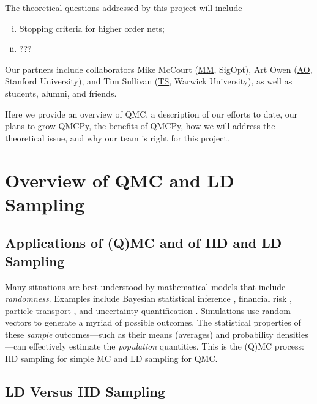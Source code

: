 \documentclass[11pt]{NSFamsart}
\newcommand{\AO}{\hyperlink{AOlink}{AO}\xspace}
\newcommand{\MM}{\hyperlink{MMlink}{MM}\xspace}
\newcommand{\TS}{\hyperlink{TSlink}{TS}\xspace}
\begin{document}
The theoretical questions addressed by this project will include
\begin{enumerate}[i.]
\item Stopping criteria for higher order nets;
\item ???
\end{enumerate}

Our partners include  collaborators \hypertarget{MMlink}{Mike McCourt} (\MM, SigOpt), \hypertarget{AOlink}{Art Owen} (\AO, Stanford University), and \hypertarget{TSlink}{Tim Sullivan} (\TS, Warwick University), as well as students, alumni, and friends.

Here we provide an overview of QMC, a description of our efforts to date, our plans to grow QMCPy, the benefits of QMCPy, how we will address the theoretical issue, and why our team is right for this project.

\section{Overview of QMC and LD Sampling}

\subsection{Applications of (Q)MC and of IID and LD Sampling}
Many situations are best understood by mathematical models that include \emph{randomness}.  Examples include Bayesian statistical inference \cite{GelEtal13, EfrHas16}, financial risk \cite{Gla03,LEc09}, particle transport \cite{Hag14,Spa95,Vea97}, and uncertainty quantification \cite{Smi14a,HerSch20a}.  Simulations use random vectors to generate a myriad of possible outcomes.  The statistical properties of these \emph{sample} outcomes---such as their means (averages) and probability densities---can effectively estimate the \emph{population} quantities.  This is the (Q)MC process:  IID sampling for simple MC and LD sampling for QMC.

\subsection{LD Versus IID Sampling} \label{sec:LDvsIID}
\end{document}

